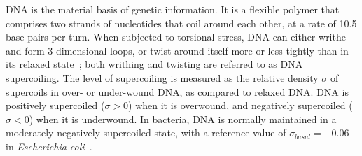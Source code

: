 DNA is the material basis of genetic information.
It is a flexible polymer that comprises two strands of nucleotides that coil around each other, at a rate of 10.5 base pairs per turn.
When subjected to torsional stress, DNA can either writhe and form 3-dimensional loops, or twist around itself more or less tightly than in its relaxed state~\citep{travers2005}; both writhing and twisting are referred to as DNA supercoiling.
The level of supercoiling is measured as the relative density $\sigma$ of supercoils in over- or under-wound DNA, as compared to relaxed DNA.
DNA is positively supercoiled ($\sigma > 0$) when it is overwound, and negatively supercoiled ($\sigma < 0$) when it is underwound.
In bacteria, DNA is normally maintained in a moderately negatively supercoiled state, with a reference value of $\sigma_{basal}=-0.06$ in \emph{Escherichia coli}~\citep{travers2005}.

